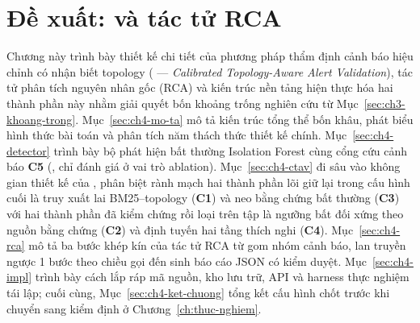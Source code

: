 %        
%        
%        
%        
%

\chapter{Đề xuất: \CTAV{} và tác tử RCA}
\label{ch:de-xuat}

Chương này trình bày thiết kế chi tiết của phương pháp thẩm định cảnh báo hiệu chỉnh có nhận biết topology (\CTAV{} — \emph{Calibrated Topology-Aware Alert Validation}), tác tử phân tích nguyên nhân gốc (RCA) và kiến trúc nền tảng hiện thực hóa hai thành phần này nhằm giải quyết bốn khoảng trống nghiên cứu từ Mục~\ref{sec:ch3-khoang-trong}. Mục~\ref{sec:ch4-mo-ta} mô tả kiến trúc tổng thể bốn khâu, phát biểu hình thức bài toán và phân tích năm thách thức thiết kế chính. Mục~\ref{sec:ch4-detector} trình bày bộ phát hiện bất thường Isolation Forest cùng cổng cứu cảnh báo \textbf{C5} (, chỉ đánh giá ở vai trò ablation). Mục~\ref{sec:ch4-ctav} đi sâu vào không gian thiết kế của \CTAV{}, phân biệt rành mạch hai thành phần lõi giữ lại trong cấu hình cuối là truy xuất lai BM25--topology (\textbf{C1}) và neo bằng chứng bất thường (\textbf{C3}) với hai thành phần đã kiểm chứng rồi loại trên tập  là ngưỡng bất đối xứng theo nguồn bằng chứng (\textbf{C2}) và định tuyến hai tầng thích nghi (\textbf{C4}). Mục~\ref{sec:ch4-rca} mô tả ba bước khép kín của tác tử RCA từ gom nhóm cảnh báo, lan truyền ngược 1 bước theo chiều gọi đến sinh báo cáo JSON có kiểm duyệt. Mục~\ref{sec:ch4-impl} trình bày cách lắp ráp mã nguồn, kho lưu trữ, API và harness thực nghiệm tái lập; cuối cùng, Mục~\ref{sec:ch4-ket-chuong} tổng kết cấu hình chốt trước khi chuyển sang kiểm định ở Chương~\ref{ch:thuc-nghiem}.

